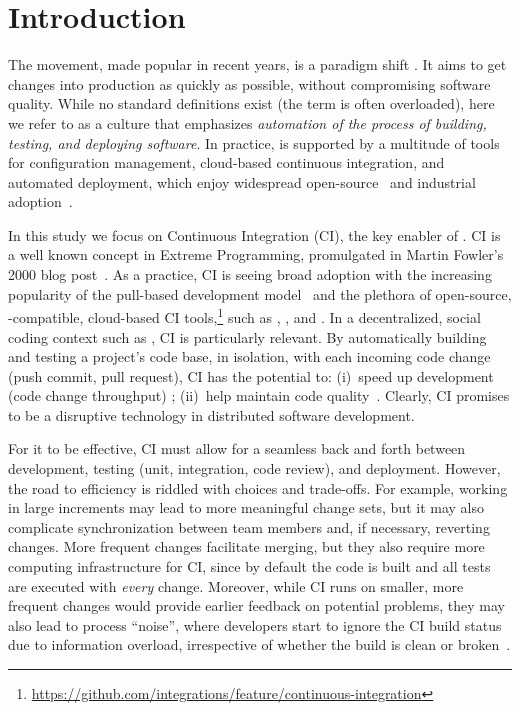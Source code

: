 
\section{Introduction}

The \DO movement, made popular in recent years, is a paradigm shift 
\cite{degrandis2011devops, loukides2012devops, humble2011enterprises, 
roche2013adopting}.
It aims to get changes into production as quickly as 
possible, without compromising software quality.
While no standard definitions exist (the term is often overloaded), here
we refer to \DO as a culture that emphasizes \emph{automation of the 
process of building, testing, and deploying software}.
In practice, \DO is supported by a multitude of tools for configuration 
management, cloud-based continuous integration, and automated deployment,
which enjoy widespread open-source~\cite{Hilton2016} and industrial 
adoption~\cite{rightscale, hilton2016continuous}.

In this study we focus on Continuous Integration (CI), the key enabler of \DO.
CI is a well known concept in Extreme Programming, promulgated in 
Martin Fowler's 2000 blog post~\cite{fowler2000continuous}.
As a practice, CI is seeing broad adoption with the increasing popularity
of the \GH pull-based development model~\cite{gousios2014exploratory}
and the plethora of open-source, \GH-compatible, cloud-based CI 
tools,\footnote{\url{https://github.com/integrations/feature/continuous-integration}}
such as \Tvis, \CB, and \CCI.
In a decentralized, social coding context such as \GH, CI is particularly relevant. 
By automatically building and testing a project's code base, in isolation, 
with each incoming code change (\ie push commit, pull request), CI 
has the potential to: (i)~speed up development (code change throughput)
\cite{Stolberg, pham2013creating, Hilton2016};
(ii)~help maintain code quality~\cite{VasilescuYWDF15, gousios2015work}.
Clearly, CI promises to be a disruptive technology in distributed software
development.

For it to be effective, CI must allow for a seamless back and forth between
development, testing (\eg unit, integration, code review), and deployment. 
However, the road to efficiency is riddled with choices and trade-offs.
For example, working in large increments may lead to more meaningful
change sets, but it may also complicate synchronization between team 
members and, if necessary, reverting changes.
More frequent changes facilitate merging, but they also require more 
computing infrastructure for CI, since by default the code is built and all 
tests are executed with \emph{every} change.
Moreover, while CI runs on smaller, more frequent changes would provide 
earlier feedback on potential problems, they may also lead to process 
``noise'', where developers start to ignore the CI build status due to 
information overload, irrespective of whether the build is clean or 
broken~\cite{DeadCI}.


